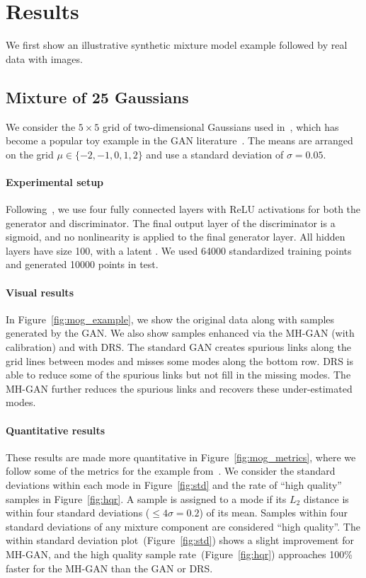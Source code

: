 \documentclass{article}
\renewcommand{\vec}[1]{{\boldsymbol{\mathbf{#1}}}} %
\newcommand{\R}{\mathbb{R}}
\begin{document}


\section{Results}
\label{sec:Results}

We first show an illustrative synthetic mixture model example followed by real data with images.

\subsection{Mixture of 25 Gaussians}

We consider the $5 \times 5$ grid of two-dimensional Gaussians used in~\citet{Azadi2018}, which has become a popular toy example in the GAN literature~\citep{Dumoulin2016}.
The means are arranged on the grid $\mu \in \{{-2},{-1},0,1,2\}$ and use a standard deviation of $\sigma = 0.05$.

\paragraph{Experimental setup}
Following~\citet{Azadi2018}, we use four fully connected layers with ReLU activations for both the generator and discriminator.
The final output layer of the discriminator is a sigmoid, and no nonlinearity is applied to the final generator layer.
All hidden layers have size 100, with a latent \smash{$\vec z \in \R^2$}.
We used \num{64000} standardized training points and generated \num{10000} points in test.

\paragraph{Visual results}
In Figure~\ref{fig:mog_example}, we show the original data along with samples generated by the GAN\@.
We also show samples enhanced via the MH-GAN (with calibration) and with DRS\@.
The standard GAN creates spurious links along the grid lines between modes and misses some modes along the bottom row.
DRS is able to reduce some of the spurious links but not fill in the missing modes.
The MH-GAN further reduces the spurious links and recovers these under-estimated modes.

\paragraph{Quantitative results}
These results are made more quantitative in Figure~\ref{fig:mog_metrics}, where we follow some of the metrics for the example from~\citet{Azadi2018}.
We consider the standard deviations within each mode in Figure~\ref{fig:std} and the rate of ``high quality'' samples in Figure~\ref{fig:hqr}.
A sample is assigned to a mode if its $L_2$ distance is within four standard deviations ($\leq 4 \sigma = 0.2$) of its mean.
Samples within four standard deviations of any mixture component are considered ``high quality''.
The within standard deviation plot~(Figure~\ref{fig:std}) shows a slight improvement for MH-GAN, and the high quality sample rate~(Figure~\ref{fig:hqr}) approaches 100\% faster for the MH-GAN than the GAN or DRS\@.
\end{document}
